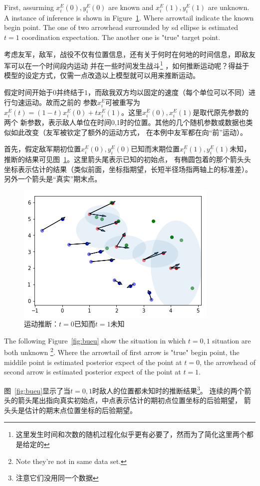 \documentclass{article}
\begin{document}
First, assurming $x^E_i(0),y^E_i(0)$ are known and $x^E_i(1),y^E_i(1)$ are unknown.
A instance of inference is shown in Figure~\ref{fig:bkeu}. 
Where arrowtail indicate the known begin point.
The one of two arrowhead surrounded by sd ellipse is estimated $t=1$ coordination expectation. 
The another one is "true" target point.

考虑友军，敌军，战役不仅有位置信息，还有关于何时在何地的时间信息，即敌友军可以在一个时间段内运动
并在一些时间发生战斗\footnote{这里发生时间和次数的随机过程化似乎更有必要了，然而为了简化这里两个都是给定的}
，如何推断运动呢？得益于模型的设定方式，仅需一点改造以上模型就可以用来推断运动。

假定时间开始于$0$并终结于$1$，而敌我双方均以固定的速度（每个单位可以不同）进行匀速运动。故而之前的
参数$x^E_i$可被重写为$x^E_i(t) = (1-t)x^E_i(0) + tx^E_i(1)$。这里$x^E_i(0),x^E_i(1)$是取代原先参数的两个
新参数，表示敌人单位在时间0,1时的位置。其他的几个随机参数或数据也类似如此改变（友军被钦定了额外的运动方式，
在本例中友军都在向“前”运动）。

首先，假定敌军期初位置$x^E_i(0),y^E_i(0)$已知而末期位置$x^E_i(1),y^E_i(1)$未知，
推断的结果可见图~\ref{fig:bkeu}。这里箭头尾表示已知的初始点，
有椭圆包着的那个箭头头坐标表示估计的结果（类似前面，坐标指期望，长短半径场指两轴上的标准差）。
另外一个箭头是“真实”期末点。

\begin{figure}[ht]
\includegraphics[width=0.4\linewidth]{bkeu.png}
\caption{运动推断：$t=0$已知而$t=1$未知}
\label{fig:bkeu}
\end{figure}

The following Figure~\ref{fig:bueu} show the situation in which $t=0,1$ situation are both unknown
\footnote{Note they're not in same data set.}. Where the arrowtail of first arrow is "true" begin
point, the middile point is estimated posterior expect of the point at $t=0$, the arrowhead of second arrow
is estimated posterior expect of the point at $t=1$.

图~\ref{fig:bueu}显示了当$t=0,1$时敌人的位置都未知时的推断结果\footnote{注意它们没用同一个数据}。
连续的两个箭头的箭头尾出指向真实初始点，中点表示估计的期初点位置坐标的后验期望，
箭头头是估计的期末点位置坐标的后验期望。
\end{document}
